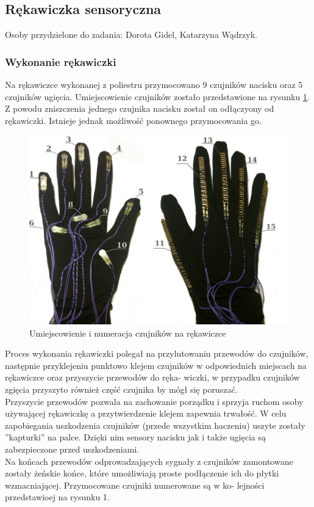 \documentclass{article}
\begin{document}

\subsection{Rękawiczka sensoryczna}
Osoby przydzielone do zadania: Dorota Gidel, Katarzyna Wądrzyk.
\subsubsection{Wykonanie rękawiczki}

Na rękawiczce wykonanej z poliestru przymocowano 9 czujników nacisku oraz 5 czujników ugięcia. Umiejscowienie czujników zostało przedstawione na rysunku \ref{rys:czujniki_numeracja}. Z powodu zniszczenia jednego czujnika nacisku został on odłączyony od rękawiczki. Istnieje jednak możliwość ponownego przymocowania go.\\
\begin{figure}[H]
    \centering
    \includegraphics[width=14cm]{rekawiczka_umiejscowienie.jpg}
    \caption{Umiejscowienie i numeracja czujników na rękawiczce}
    \label{rys:czujniki_numeracja}
\end{figure}
Proces wykonania rękawiczki polegał na przylutowaniu przewodów do czujników, następnie przyklejeniu
punktowo klejem czujników w odpowiednich miejscach na rękawiczce oraz przyszycie przewodów do ręka-
wiczki, w przypadku czujników zgięcia przyszyto również część czujnika by mógł się poruszać.\\
Przyszycie przewodów pozwala na zachowanie porządku i sprzyja ruchom osoby używającej rękawiczkę a
przytwierdzenie klejem zapewnia trwałość. W celu zapobiegania uszkodzenia czujników (przede wszystkim
haczeniu) uszyte zostały ”kapturki” na palce. Dzięki nim sensory nacisku jak i także ugięcia są zabezpieczone
przed uszkodzeniami.\\
Na końcach przewodów odprowadzających sygnały z czujników zamontowane zostały żeńskie końce, które
umożliwiają proste podłączenie ich do płytki wzmacniającej. Przymocowane czujniki numerowane są w ko-
lejności przedstawioej na rysunku 1.\\
\end{document}
